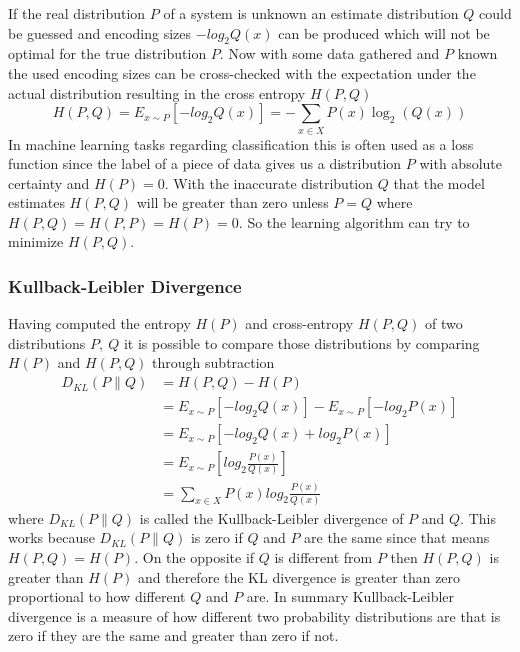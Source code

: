 If the real distribution $P$ of a system is unknown an estimate distribution $Q$ could be guessed
and encoding sizes $-log_{2}Q(x)$ can be produced which will not be optimal for the true distribution
$P$. Now with some data gathered and $P$ known the used encoding sizes can be cross-checked with the
expectation under the actual distribution resulting in the cross entropy $H(P,Q)$
\begin{equation}
    H(P,Q)=E_{x\sim P}[-log_{2}Q(x)]=-\sum_{x\in X} P(x)\log_{2} (Q(x))
\end{equation}
In machine learning tasks regarding classification this is often used as a loss function since the
label of a piece of data gives us a distribution $P$ with absolute certainty and $H(P)=0$. With the
inaccurate distribution $Q$ that the model estimates $H(P,Q)$ will be greater than zero unless
$P=Q$ where $H(P,Q)=H(P,P)=H(P)=0$. So the learning algorithm can try to minimize $H(P,Q)$.

\subsubsection{Kullback-Leibler Divergence}

Having computed the entropy $H(P)$ and cross-entropy $H(P,Q)$ of two distributions $P,\ Q$ it is 
possible to compare those distributions by comparing $H(P)$ and $H(P,Q)$ through subtraction
\begin{equation} \label{eq1}
    \begin{split}
        D_{KL}(P\parallel Q)    & = H(P,Q)-H(P) \\
                                & = E_{x\sim P}[-log_{2}Q(x)]-E_{x\sim P}[-log_{2}P(x)]\\
                                & = E_{x\sim P}[-log_{2}Q(x)+log_{2}P(x)]\\
                                & = E_{x\sim P}[log_{2}\frac{P(x)}{Q(x)}]\\
                                & = \sum_{x\in X} P(x)log_{2}\frac{P(x)}{Q(x)}
    \end{split}
\end{equation}
where $D_{KL}(P\parallel Q)$ is called the Kullback-Leibler divergence of $P$ and $Q$. This works
because $D_{KL}(P\parallel Q)$ is zero if $Q$ and $P$ are the same since that means $H(P,Q)=H(P)$.
On the opposite if $Q$ is different from $P$ then $H(P,Q)$ is greater than $H(P)$ and therefore 
the KL divergence is greater than zero proportional to how different $Q$ and $P$ are.
In summary Kullback-Leibler divergence is a measure of how different two probability distributions
are that is zero if they are the same and greater than zero if not.

